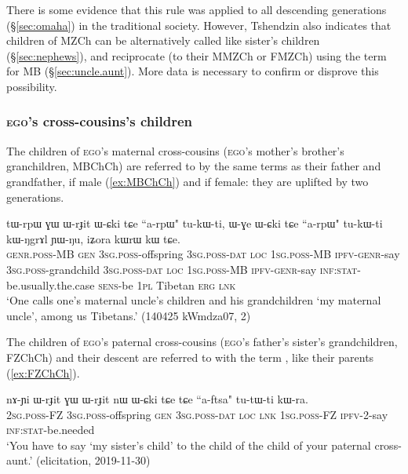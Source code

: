 There is some evidence that this rule was applied to all descending generations (§\ref{sec:omaha}) in the traditional society. However, Tshendzin  also indicates that children of MZCh can be alternatively called  like sister's children (§\ref{sec:nephews}), and reciprocate (to their MMZCh or FMZCh) using the term for MB (§\ref{sec:uncle.aunt}). More data is necessary to confirm or disprove this possibility.

\subsubsection{\textsc{ego}'s cross-cousins's children} \label{sec:MBCh.FZCh.Ch}
The children of \textsc{ego}'s maternal cross-cousins (\textsc{ego}'s mother's brother's granchildren, MBChCh) are referred to by the same terms as their father and grandfather,  if male (\ref{ex:MBChCh}) and  if female: they are uplifted by two generations.

\begin{exe}
\ex \label{ex:MBChCh}
\gll tɯ-rpɯ ɣɯ ɯ-rɟit ɯ-ɕki tɕe ``a-rpɯ" tu-kɯ-ti, ɯ-ɣe ɯ-ɕki tɕe ``a-rpɯ" tu-kɯ-ti kɯ-ŋgrɤl ɲɯ-ŋu, iʑora kɯrɯ kɯ tɕe. \\
\textsc{genr}.\textsc{poss}-MB \textsc{gen} \textsc{3sg}.\textsc{poss}-offspring \textsc{3sg}.\textsc{poss}-\textsc{dat} \textsc{loc} \textsc{1sg}.\textsc{poss}-MB \textsc{ipfv}-\textsc{genr}-say \textsc{3sg}.\textsc{poss}-grandchild \textsc{3sg}.\textsc{poss}-\textsc{dat} \textsc{loc} \textsc{1sg}.\textsc{poss}-MB \textsc{ipfv}-\textsc{genr}-say  \textsc{inf}:\textsc{stat}-be.usually.the.case \textsc{sens}-be \textsc{1pl} Tibetan \textsc{erg} \textsc{lnk} \\
\glt `One calls one's maternal uncle's children and his grandchildren  `my maternal uncle', among us Tibetans.' (140425 kWmdza07, 2)
\end{exe}

The children of \textsc{ego}'s paternal cross-cousins (\textsc{ego}'s father's sister's grandchildren, FZChCh) and their descent are referred to with the term , like their parents (\ref{ex:FZChCh}).

\begin{exe}
\ex \label{ex:FZChCh}
\gll nɤ-ɲi ɯ-rɟit ɣɯ ɯ-rɟit nɯ ɯ-ɕki tɕe tɕe ``a-ftsa" tu-tɯ-ti kɯ-ra. \\
\textsc{2sg}.\textsc{poss}-FZ \textsc{3sg}.\textsc{poss}-offspring \textsc{gen} \textsc{3sg}.\textsc{poss}-\textsc{dat} \textsc{loc} \textsc{lnk} \textsc{1sg}.\textsc{poss}-FZ \textsc{ipfv}-2-say \textsc{inf}:\textsc{stat}-be.needed \\
\glt `You have to say  `my sister's child' to the child of the child of your paternal cross-aunt.' (elicitation, 2019-11-30)
\end{exe}


